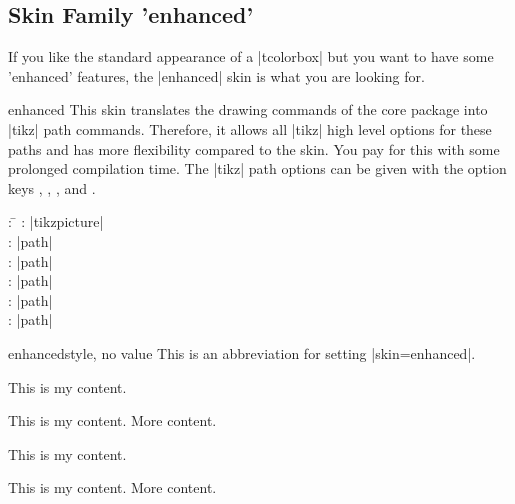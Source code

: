\clearpage
\subsection{Skin Family 'enhanced'}
\begin{marker}
If you like the standard appearance of a |tcolorbox| but you want to
have some 'enhanced' features, the |enhanced| skin is what you are looking for.
\end{marker}

\begin{docSkin}{enhanced}
  This skin translates the drawing commands of the core package into |tikz|
  path commands. Therefore, it allows all |tikz| high level options for
  these paths and has more flexibility compared to the  skin.
  You pay for this with some prolonged compilation time.
  The |tikz| path options can
  be given with the option keys
  ,
  ,
  , and
  .
\begin{tcolorbox}[skintable=enhanced]
  \begin{tabbing}
    : \=\kill
    :  \> |tikzpicture|\\ 
    :           \> |path|\\
    : \> |path|\\ 
    :        \> |path|\\
    :    \> |path|\\
    :           \> |path|
  \end{tabbing}
\end{tcolorbox}
\end{docSkin}


\begin{docTcbKey}{enhanced}{}{style, no value}
  This is an abbreviation for setting |skin=enhanced|.
\end{docTcbKey}

\begin{dispExample}
\begin{tcbraster}[enhanced,raster equal height,raster columns=4,
    colback=LightGreen,colframe=DarkGreen,colbacktitle=LimeGreen!75!DarkGreen,
    left=1mm,right=1mm,top=1mm,bottom=1mm,middle=1mm]
  \begin{tcolorbox}
    This is my content.
  \end{tcolorbox}
  \begin{tcolorbox}
    This is my content.
    \tcblower
    More content.
  \end{tcolorbox}
  \begin{tcolorbox}[adjusted title=My title]
    This is my content.
  \end{tcolorbox}
  \begin{tcolorbox}[adjusted title=My title]
    This is my content.
    \tcblower
    More content.
  \end{tcolorbox}
\end{tcbraster}
\end{dispExample}

